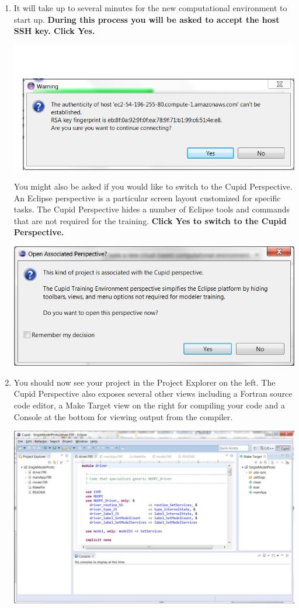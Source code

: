 \documentclass[oneside,11pt]{memoir}
\begin{document}
\begin{enumerate}
\item It will take up to several minutes for the new computational environment to start up.  \textbf{During this process you will be asked to accept the host SSH key.  Click Yes.}

\parbox{\linewidth}{\centering
  \includegraphics[width=\textwidth]{figs/cloud_fig5.png}
}

You might also be asked if you would like to switch to the Cupid Perspective.  An Eclipse perspective is a particular screen layout customized for specific tasks. The Cupid Perspective hides a number of Eclipse tools and commands that are not required for the training.  \textbf{Click Yes to switch to the Cupid Perspective.}

\parbox{\linewidth}{\centering
  \includegraphics[width=\textwidth]{figs/cloud_fig6.png}
}


\item You should now see your project in the Project Explorer on the left.  The Cupid Perspective also exposes several other views including a Fortran source code editor, a Make Target view on the right for compiling your code and a Console at the bottom for viewing output from the compiler.

\parbox{\linewidth}{\centering
  \includegraphics[width=\textwidth]{figs/cloud_fig7.png}
}


\end{enumerate}
\end{document}

